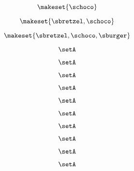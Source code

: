 \begin{forslides}
    \begin{equation}
        \label{eq:systems-157}
        \makeset{ \schoco }
    \end{equation}

    \begin{equation}
        \label{eq:systems-158}
        \makeset{ \sbretzel, \schoco }
    \end{equation}

    \begin{equation}
        \label{eq:systems-159}
        \makeset{ \sbretzel, \schoco, \sburger }
    \end{equation}

    \begin{equation}
        \label{eq:systems-160}
        \setA
    \end{equation}

    \begin{equation}
        \label{eq:systems-161}
        \setA
    \end{equation}

    \begin{equation}
        \label{eq:systems-162}
        \setA
    \end{equation}

    \begin{equation}
        \label{eq:systems-163}
        \setA
    \end{equation}

    \begin{equation}
        \label{eq:systems-164}
        \setA
    \end{equation}

    \begin{equation}
        \label{eq:systems-165}
        \setA
    \end{equation}

    \begin{equation}
        \label{eq:systems-166}
        \setA
    \end{equation}

    \begin{equation}
        \label{eq:systems-167}
        \setA
    \end{equation}

    \begin{equation}
        \label{eq:systems-168}
        \setA
    \end{equation}

    \begin{equation}
        \label{eq:systems-169}
        \setA
    \end{equation}


\end{forslides}
